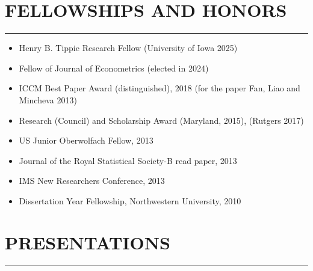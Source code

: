 \documentclass[11pt]{article}
\begin{document}









\section*{FELLOWSHIPS AND HONORS}
\hrule
\hfill
\begin{itemize}
 
 
  \item Henry B. Tippie Research Fellow (University of Iowa 2025)
 
 \item Fellow of Journal of Econometrics (elected in 2024)
 
\item ICCM Best Paper Award (distinguished), 2018  (for the paper Fan, Liao and Mincheva 2013)
 
\item  Research (Council) and Scholarship  Award (Maryland, 2015),  (Rutgers 2017)
\item US Junior Oberwolfach Fellow, 2013
\item Journal of the Royal Statistical Society-B read paper, 2013
\item IMS New Researchers Conference, 2013

\item Dissertation Year Fellowship, Northwestern University, 2010

\end{itemize}


\section*{ PRESENTATIONS}
\hrule
\hfill



\end{document}

